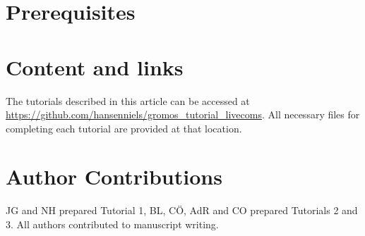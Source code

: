 \documentclass[9pt,tutorial]{../includes/livecoms}
\begin{document}



\section{Prerequisites}




\section{Content and links}

The tutorials described in this article can be accessed at \url{https://github.com/hansenniels/gromos_tutorial_livecoms}. All necessary files for completing each tutorial are provided at that location.

%








\section{Author Contributions}
%

JG and NH prepared Tutorial 1, BL, C\"O, AdR and CO prepared Tutorials 2 and 3. All authors contributed to manuscript writing.
\end{document}
